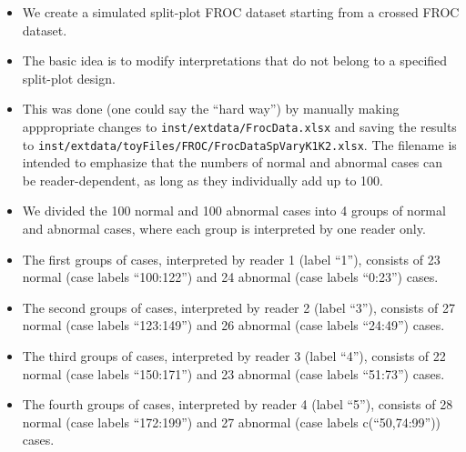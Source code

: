 \documentclass[]{book}
\providecommand{\tightlist}{%
  \setlength{\itemsep}{0pt}\setlength{\parskip}{0pt}}
\begin{document}
\begin{itemize}
\tightlist
\item
  We create a simulated split-plot FROC dataset starting from a crossed FROC dataset.
\item
  The basic idea is to modify interpretations that do not belong to a specified split-plot design.
\item
  This was done (one could say the ``hard way'') by manually making apppropriate changes to \texttt{inst/extdata/FrocData.xlsx} and saving the results to \texttt{inst/extdata/toyFiles/FROC/FrocDataSpVaryK1K2.xlsx}. The filename is intended to emphasize that the numbers of normal and abnormal cases can be reader-dependent, as long as they individually add up to 100.
\item
  We divided the 100 normal and 100 abnormal cases into 4 groups of normal and abnormal cases, where each group is interpreted by one reader only.
\item
  The first groups of cases, interpreted by reader 1 (label ``1''), consists of 23 normal (case labels ``100:122'') and 24 abnormal (case labels ``0:23'') cases.
\item
  The second groups of cases, interpreted by reader 2 (label ``3''), consists of 27 normal (case labels ``123:149'') and 26 abnormal (case labels ``24:49'') cases.
\item
  The third groups of cases, interpreted by reader 3 (label ``4''), consists of 22 normal (case labels ``150:171'') and 23 abnormal (case labels ``51:73'') cases.
\item
  The fourth groups of cases, interpreted by reader 4 (label ``5''), consists of 28 normal (case labels ``172:199'') and 27 abnormal (case labels c(``50,74:99'')) cases.
\end{itemize}
\end{document}
